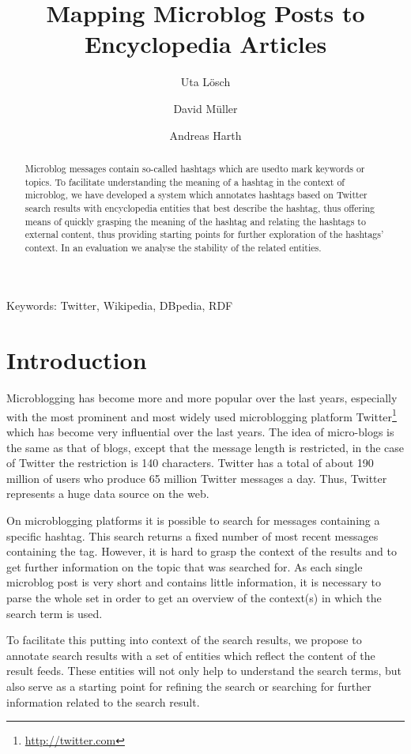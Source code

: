 \documentclass{llncs}
\title{Mapping Microblog Posts to Encyclopedia Articles}
\author{Uta L\"{o}sch \and David M\"{u}ller \and Andreas Harth}
\institute{
	Karlsruhe Institute of Technology (KIT), D-76131 Karlsruhe, Germany\\ 
	\email{uta.loesch@kit.edu},\\
	\email{david.mueller@student.kit.edu},\\
	\email{harth@kit.edu}
}
\newcommand{\nop}[1]{}
\begin{document}
\maketitle

\begin{abstract}
Microblog messages contain so-called hashtags which are usedto mark keywords or topics. To facilitate understanding the meaning of a hashtag in the context of microblog, we have developed a system which annotates hashtags based on Twitter search results with encyclopedia entities that best describe the hashtag, thus offering means of quickly grasping the meaning of the hashtag and relating the hashtags to external content, thus providing starting points for further exploration of the hashtags' context. In an evaluation we analyse the stability of the related entities.
\end{abstract}

Keywords: Twitter, Wikipedia, DBpedia, RDF

\nop{
http://tagdef.com/ has a list of popular tags
}

\section{Introduction}

Microblogging has become more and more popular over the last years, especially with the most prominent and most widely used microblogging platform Twitter\footnote{\url{http://twitter.com}} which has become very influential over the last years. The idea of micro-blogs is the same as that of blogs, except that the message length is restricted, in the case of Twitter the restriction is 140 characters. Twitter has a total of about 190 million of users who produce 65 million Twitter messages a day. Thus, Twitter represents a huge data source on the web.

On microblogging platforms it is possible to search for messages containing a specific hashtag. This search returns a fixed number of most recent messages containing the tag. However, it is hard to grasp the context of the results and to get further information on the topic that was searched for. As each single microblog post is very short and contains little information, it is necessary to parse the whole set in order to get an overview of the context(s) in which the search term is used. 

To facilitate this putting into context of the search results, we propose to annotate search results with a set of entities which reflect the content of the result feeds. These entities will not only help to understand the search terms, but also serve as a starting point for refining the search or searching for further information related to the search result.
\end{document}
